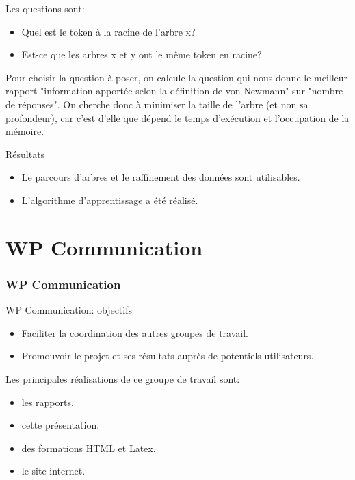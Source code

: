 \documentclass[slidetop]{beamer}
\begin{document}
\begin{frame}

Les questions sont:
\begin{itemize}
    \item Quel est le token à la racine de l'arbre x?
    \item Est-ce que les arbres x et y ont le même token en racine?
\end{itemize}


Pour choisir la question à poser, 
on calcule la question qui nous donne le meilleur rapport "information apportée selon la définition de von Newmann" sur "nombre de réponses". 
On cherche donc à minimiser la taille de l'arbre (et non sa profondeur),
car c'est d'elle que dépend le temps d'exécution et l'occupation de la mémoire.
\end{frame}
\begin{frame}

Résultats
\begin{itemize}
    \item Le parcours d'arbres et le raffinement des données sont utilisables.
    \item L'algorithme d'apprentissage a été réalisé.
\end{itemize}




\end{frame}


\section{WP Communication}


\begin{frame}
\frametitle{WP Communication} 

WP Communication: objectifs
\begin{itemize}
    \item Faciliter la coordination des autres groupes de travail.
    \item Promouvoir le projet et ses résultats auprès de potentiels utilisateurs.
\end{itemize}


\end{frame}


\begin{frame}

Les principales réalisations de ce groupe de travail sont:
\begin{itemize}
 
    \item les rapports. %
    \item cette présentation.
    \item des formations HTML et Latex. %
    \item le site internet.

\end{itemize}
\end{frame}
\end{document}
